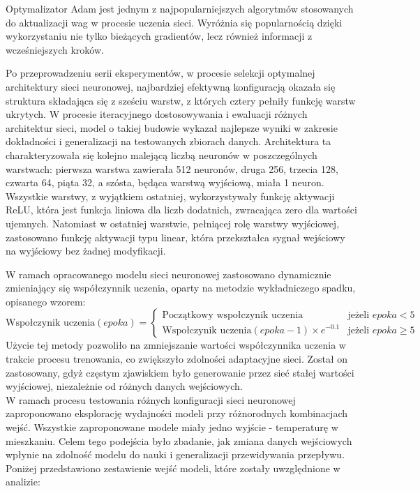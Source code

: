 \documentclass[a4paper,twoside,12pt]{book}
\begin{document}
Optymalizator Adam jest jednym z najpopularniejszych algorytmów stosowanych do aktualizacji wag w procesie uczenia sieci. Wyróżnia się popularnością dzięki wykorzystaniu nie tylko bieżących gradientów, lecz również informacji z wcześniejszych kroków.

Po przeprowadzeniu serii eksperymentów, w procesie selekcji optymalnej architektury sieci neuronowej, najbardziej efektywną konfiguracją okazała się struktura składająca się z sześciu warstw, z których cztery pełniły funkcję warstw ukrytych. W procesie iteracyjnego dostosowywania i ewaluacji różnych architektur sieci, model o takiej budowie wykazał najlepsze wyniki w zakresie dokładności i generalizacji na testowanych zbiorach danych. Architektura ta charakteryzowała się kolejno malejącą liczbą neuronów w poszczególnych warstwach: pierwsza warstwa zawierała 512 neuronów, druga 256, trzecia 128, czwarta 64, piąta 32, a szósta, będąca warstwą wyjściową, miała 1 neuron. Wszystkie warstwy, z wyjątkiem ostatniej, wykorzystywały funkcję aktywacji ReLU, która jest funkcja liniowa dla liczb dodatnich, zwracająca zero dla wartości ujemnych. Natomiast w ostatniej warstwie, pełniącej rolę warstwy wyjściowej, zastosowano funkcję aktywacji typu linear, która przekształca sygnał wejściowy na wyjściowy bez żadnej modyfikacji.


W ramach opracowanego modelu sieci neuronowej zastosowano dynamicznie zmieniający się współczynnik uczenia, oparty na metodzie wykładniczego spadku, opisanego wzorem:
\begin{equation}
  \text{Wspołczynik uczenia}(epoka) =
  \begin{cases}
    \text{Początkowy wspołczynik uczenia}                 & \text{jeżeli } epoka < 5    \\
    \text{Wspołczynik uczenia}(epoka - 1) \times e^{-0.1} & \text{jeżeli } epoka \geq 5
  \end{cases}
\end{equation}
Użycie tej metody pozwoliło na zmniejszanie wartości współczynnika uczenia w trakcie procesu trenowania, co zwiększyło zdolności adaptacyjne sieci. Został on zastosowany, gdyż częstym zjawiskiem było generowanie przez sieć stałej wartości wyjściowej, niezależnie od różnych danych wejściowych.\\

W ramach procesu testowania różnych konfiguracji sieci neuronowej zaproponowano eksplorację wydajności modeli przy różnorodnych kombinacjach wejść. Wszystkie zaproponowane modele miały jedno wyjście - temperaturę w mieszkaniu. Celem tego podejścia było zbadanie, jak zmiana danych wejściowych wpłynie na zdolność modelu do nauki i generalizacji przewidywania przepływu. Poniżej przedstawiono zestawienie wejść modeli, które zostały uwzględnione w analizie:
\end{document}
